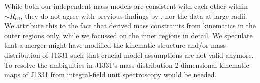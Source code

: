 \documentclass[useAMS,usenatbib]{mnras}
\begin{document}
While both our independent mass models are consistent with each other within $\sim R_\text{eff}$, they do not agree with previous findings by \citet{SWELLSV}, nor the data at large radii. We attribute this to the fact that \citet{SWELLSV} derived mass constraints from kinematics in the outer regions only, while we focussed on the inner regions in detail. We speculate that a merger might have modified the kinematic structure and/or mass distribution of J1331 such that crucial model assumptions are not valid anymore. To resolve the ambiguities in J1331's mass distribution 2-dimensional kinematic maps of J1331 from integral-field unit spectroscopy would be needed.




\label{lastpage}
\end{document}
